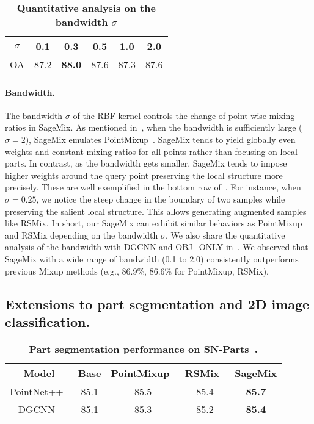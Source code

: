 \documentclass{article}
\begin{document}
\begin{table}[t!]
  \centering 
  \setlength{\tabcolsep}{8pt}
  \renewcommand{\arraystretch}{1.1}
  \caption{\textbf{Quantitative analysis on the bandwidth $\sigma$}}
  \label{table:bandwidth} 
  \begin{tabular}{c|ccccc}
  \toprule
  $\sigma$ & 0.1 & 0.3 & 0.5 & 1.0 & 2.0 \\
  \midrule
  \midrule
  OA & 87.2 & \textbf{88.0} & 87.6 & 87.3 & 87.6 \\
  \bottomrule
  \end{tabular}
  
\end{table}  \paragraph{Bandwidth.} The bandwidth $\sigma$ of the RBF kernel controls the change of point-wise mixing ratios in SageMix. 
As mentioned in~, when the bandwidth is sufficiently large ($\sigma = 2)$, SageMix emulates PointMixup~\cite{chen2020pointmixup}.
SageMix tends to yield globally even weights and constant mixing ratios for all points rather than focusing on local parts. 
In contrast, as the bandwidth gets smaller, SageMix tends to impose higher weights around the query point preserving the local structure more precisely. 
These are well exemplified in the bottom row of~. For instance, when $\sigma=0.25$, we notice the steep change in the boundary of two samples while preserving the salient local structure. 
This allows generating augmented samples like RSMix.
In short, our SageMix can exhibit similar behaviors as PointMixup and RSMix depending on the bandwidth $\sigma$. 
We also share the quantitative analysis of the bandwidth with DGCNN and OBJ\_ONLY in~. We observed that SageMix with a wide range of bandwidth  (0.1 to 2.0) consistently outperforms previous Mixup methods (e.g., 86.9\%, 86.6\% for PointMixup, RSMix). 


\subsection{Extensions to part segmentation and 2D image classification.}
\label{sec:exp.3}

\begin{table}[t!]
  \centering 
  \setlength{\tabcolsep}{8pt}
\renewcommand{\arraystretch}{1.1}
  \caption{\textbf{Part segmentation performance on SN-Parts~\cite{xu2021image2point}.}}
  \label{table:part} 
  \begin{tabular}{c|ccc|c}
  \toprule
  \textbf{Model} & Base & PointMixup~\cite{chen2020pointmixup} & RSMix~\cite{lee2021regularization} & \textbf{SageMix} \\
  \midrule
  \midrule 
  PointNet++~\cite{qi2017pointnet++}& 85.1 & 85.5 & 85.4 & \textbf{85.7}\\
  DGCNN~\cite{wang2019dynamic}& 85.1 & 85.3 & 85.2 & \textbf{85.4}\\


  \bottomrule
  \end{tabular}
  
  
\end{table} 
\end{document}
